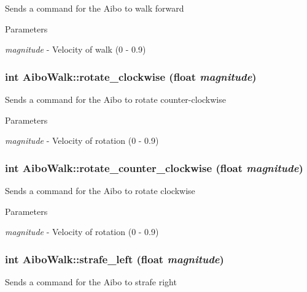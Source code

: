 \label{classAiboWalk_ad0af8173899889a2493657027100f7f8}
Sends a command for the Aibo to walk forward 
\begin{DoxyParams}{Parameters}
\item[{\em magnitude}]-\/ Velocity of walk (0 -\/ 0.9) \end{DoxyParams}
\hypertarget{classAiboWalk_a5f4b9c1911e4486f13f45a7afb4d8d4a}{
\subsubsection[{rotate\_\-clockwise}]{\setlength{\rightskip}{0pt plus 5cm}int AiboWalk::rotate\_\-clockwise (float {\em magnitude})}}
\label{classAiboWalk_a5f4b9c1911e4486f13f45a7afb4d8d4a}
Sends a command for the Aibo to rotate counter-\/clockwise 
\begin{DoxyParams}{Parameters}
\item[{\em magnitude}]-\/ Velocity of rotation (0 -\/ 0.9) \end{DoxyParams}
\hypertarget{classAiboWalk_a93290f3abdbdbeb4482d91d0557f70ae}{
\subsubsection[{rotate\_\-counter\_\-clockwise}]{\setlength{\rightskip}{0pt plus 5cm}int AiboWalk::rotate\_\-counter\_\-clockwise (float {\em magnitude})}}
\label{classAiboWalk_a93290f3abdbdbeb4482d91d0557f70ae}
Sends a command for the Aibo to rotate clockwise 
\begin{DoxyParams}{Parameters}
\item[{\em magnitude}]-\/ Velocity of rotation (0 -\/ 0.9) \end{DoxyParams}
\hypertarget{classAiboWalk_a05599002238d8bf717655f2244a8d646}{
\subsubsection[{strafe\_\-left}]{\setlength{\rightskip}{0pt plus 5cm}int AiboWalk::strafe\_\-left (float {\em magnitude})}}
\label{classAiboWalk_a05599002238d8bf717655f2244a8d646}
Sends a command for the Aibo to strafe right 
